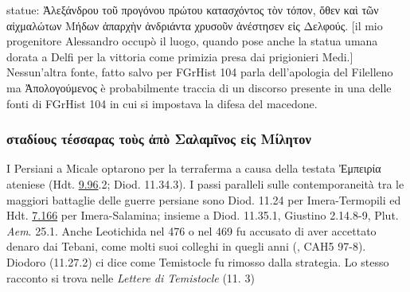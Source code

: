 {statue: \textgreek{Ἀλεξάνδρου τοῦ προγόνου πρώτου κατασχόντος τὸν τόπον, ὅθεν καὶ τῶν αἰχμαλώτων Μήδων ἀπαρχὴν ἀνδριάντα χρυσοῦν ἀνέστησεν εἰς Δελφούς.} [il mio progenitore Alessandro occupò il luogo, quando pose anche la statua umana dorata a Delfi per la vittoria come primizia presa dai prigionieri Medi.] Nessun'altra fonte, fatto salvo per FGrHist 104 parla dell'apologia del Filelleno ma \textgreek{Ἀπολογούμενος} è probabilmente traccia di un discorso presente in una delle fonti di FGrHist 104 in cui si impostava la difesa del macedone.
    \subsubsection{\textgreek{σταδίους τέσσαρας τοὺς ἀπὸ Σαλαμῖνος εἰς Μίλητον}}
    I Persiani a Micale optarono per la terraferma a causa della testata \textgreek{Ἐμπειρία} ateniese (Hdt. \href{http://data.perseus.org/citations/urn:cts:greekLit:tlg0016.tlg001.perseus-grc1:9.96}{9.96}.2; Diod. 11.34.3). I passi paralleli sulle contemporaneità tra le maggiori battaglie delle guerre persiane sono Diod. 11.24 per Imera-Termopili ed Hdt. \href{http://data.perseus.org/citations/urn:cts:greekLit:tlg0016.tlg001.perseus-grc1:7.166}{7.166} per Imera-Salamina; insieme a Diod. 11.35.1,   Giustino 2.14.8-9,  Plut. \emph{Aem}. 25.1. 
    Anche Leotichida nel 476 o nel 469 fu accusato di aver accettato denaro dai Tebani, come molti suoi colleghi in quegli anni (\cite[204]{Flower2002}, CAH5 97-8).  Diodoro (11.27.2) ci dice come Temistocle fu rimosso dalla strategia. Lo stesso racconto si trova nelle \emph{Lettere di Temistocle} (11. 3)
}
